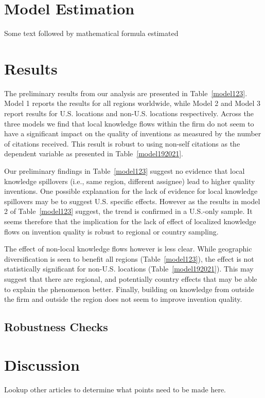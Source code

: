 \documentclass[12pt,letterpaper]{article}
\begin{document}
\section*{Model Estimation}
Some text followed by mathematical formula estimated

\section*{Results}
The preliminary results from our analysis are presented in Table~\ref{model123}. Model 1 reports the results for all regions worldwide, while Model 2 and Model 3 report results for U.S. locations and non-U.S. locations respectively. Across the three models we find that local knowledge flows within the firm do not seem to have a significant impact on the quality of inventions as measured by the number of citations received. This result is robust to using non-self citations as the dependent variable as presented in Table~\ref{model192021}. \par
Our preliminary findings in Table~\ref{model123} suggest no evidence that local knowledge spillovers (i.e., same region, different assignee) lead to higher quality inventions.  One possible explanation for the lack of evidence for local knowledge spillovers may be to suggest U.S. specific effects. However as the results in model 2 of Table~\ref{model123} suggest, the trend is confirmed in a U.S.-only sample. It seems therefore that the implication for the lack of effect of localized knowledge flows on invention quality is robust to regional or country sampling. \par
The effect of non-local knowledge flows however is less clear. While geographic diversification is seen to benefit all regions (Table~\ref{model123}), the effect is not statistically significant for non-U.S. locations (Table~\ref{model192021}). This may suggest that there are regional, and potentially country effects that may be able to explain the phenomenon better. Finally, building on knowledge from outside the firm and outside the region does not seem to improve invention quality.\par
\subsection{Robustness Checks}

\section*{Discussion}
Lookup other articles to determine what points need to be made here.
\end{document}
